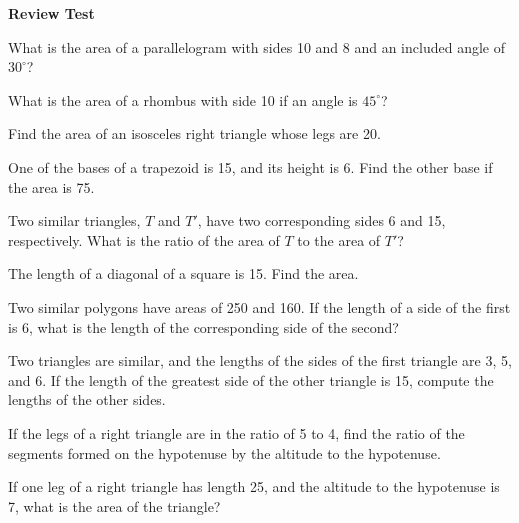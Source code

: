 \documentclass[11pt]{book}
\begin{document}
\par\medskip\begin{center}\bfseries Review Test\end{center}\par\nopagebreak
\begin{exlist}
\item What is the area of a parallelogram with sides 10 and 8 and an included
  angle of $30^\circ$?
\item What is the area of a rhombus with side 10 if an angle is $45^\circ$?
\item Find the area of an isosceles right triangle whose legs are 20.
\item One of the bases of a trapezoid is 15, and its height is 6. Find the
  other base if the area is 75.
\item Two similar triangles, $T$ and $T'$, have two corresponding sides 6 and
  15, respectively. What is the ratio of the area of $T$ to the area of $T'$?
\item The length of a diagonal of a square is 15. Find the area.
\item Two similar polygons have areas of 250 and 160. If the length of a side
  of the first is 6, what is the length of the corresponding side of the
  second?
\item Two triangles are similar, and the lengths of the sides of the first
  triangle are 3, 5, and 6. If the length of the greatest side of the other
  triangle is 15, compute the lengths of the other sides.
\item If the legs of a right triangle are in the ratio of 5 to 4, find the
  ratio of the segments formed on the hypotenuse by the altitude to the
  hypotenuse.
\item If one leg of a right triangle has length 25, and the altitude to the
  hypotenuse is 7, what is the area of the triangle?
\end{exlist}
\end{document}
